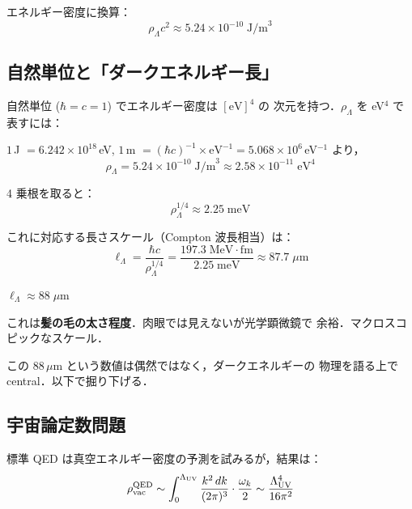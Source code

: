 \documentclass[11pt,a4paper]{article}
\begin{document}
エネルギー密度に換算：
\begin{equation}
\boxed{\rho_\Lambda c^2 \approx 5.24 \times 10^{-10}\;\text{J/m}^3}
\end{equation}

\subsection{自然単位と「ダークエネルギー長」}

自然単位 ($\hbar = c = 1$) でエネルギー密度は $[\text{eV}]^4$ の
次元を持つ．$\rho_\Lambda$ を eV$^4$ で表すには：

$1$\,J $= 6.242 \times 10^{18}$\,eV, $1$\,m $= (\hbar c)^{-1} \times \text{eV}^{-1}
= 5.068 \times 10^{6}$\,eV$^{-1}$ より，
\begin{equation}
\rho_\Lambda = 5.24 \times 10^{-10}\;\text{J/m}^3 \approx
2.58 \times 10^{-11}\;\text{eV}^4
\end{equation}

4 乗根を取ると：
\begin{equation}
\boxed{\rho_\Lambda^{1/4} \approx 2.25\;\text{meV}}
\end{equation}

これに対応する長さスケール（Compton 波長相当）は：
\begin{equation}
\ell_\Lambda = \frac{\hbar c}{\rho_\Lambda^{1/4}} =
\frac{197.3\;\text{MeV}\cdot\text{fm}}{2.25\;\text{meV}}
\approx 87.7\;\mu\text{m}
\end{equation}

\begin{tcolorbox}[colback=blue!5,colframe=blue!50!black,title=ダークエネルギー長スケール]
\begin{center}
\Large
$\ell_\Lambda \approx 88\;\mu\text{m}$
\end{center}
これは\textbf{髪の毛の太さ程度}．肉眼では見えないが光学顕微鏡で
余裕．マクロスコピックなスケール．
\end{tcolorbox}

この 88\,$\mu$m という数値は偶然ではなく，ダークエネルギーの
物理を語る上で central．以下で掘り下げる．

\subsection{宇宙論定数問題}

標準 QED は真空エネルギー密度の予測を試みるが，結果は：
\begin{equation}
\rho_{\rm vac}^{\rm QED} \sim \int_0^{\Lambda_{\rm UV}} \frac{k^2\,dk}{(2\pi)^3}
\cdot \frac{\omega_k}{2} \sim \frac{\Lambda_{\rm UV}^4}{16\pi^2}
\end{equation}
\end{document}
